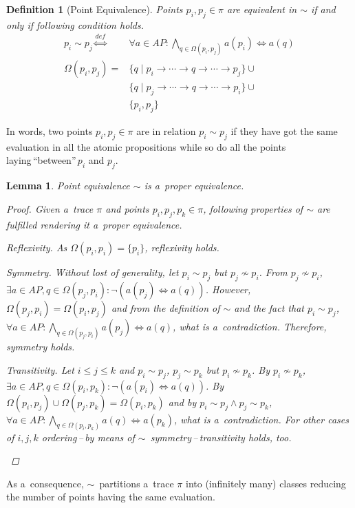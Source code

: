\documentclass[12pt,twoside,draft]{fithesis}
\newtheorem{mydef}{Definition}
\newtheorem{mylemma}{Lemma}
\begin{document}
\begin{mydef}[Point Equivalence]
Points $p_i,p_j\in\pi$ are equivalent in $\sim$ if and only if following
condition holds.
\begin{align}
	p_i\sim p_j	\overset{def}{\iff}&\forall a\in AP:
		\bigwedge_{q\in\Omega(p_i,p_j)}a(p_i)\iff a(q)\\
\Omega(p_i,p_j)=&\{q\mid p_i\rightarrow\dotsm\rightarrow q
		\rightarrow\dotsm\rightarrow p_j\}\cup\nonumber\\
		&\{q\mid p_j\rightarrow\dotsm\rightarrow q\rightarrow\dotsm
		\rightarrow p_i\}\cup\nonumber\\
		&\{p_i,p_j\}
\end{align}
\end{mydef}
In words, two points $p_i,p_j\in\pi$ are in relation $p_i\sim p_j$ if
they have got the same evaluation in all the atomic propositions while
so do all the points laying\,``between''\,$p_i$ and $p_j$.
\begin{mylemma}
Point equivalence $\sim$ is a~proper equivalence.
\begin{proof}Given a~trace $\pi$ and points $p_i,p_j,p_k\in\pi$,
following properties of $\sim$ are fulfilled rendering it a~proper
equivalence.
	\begin{inparaenum}
		\item{Reflexivity.} As $\Omega(p_i,p_i)=\{p_i\}$,
			reflexivity holds.
		\item{Symmetry.} Without lost of generality, let $p_i\sim p_j$
			but $p_j\not\sim p_i$. From $p_j\not\sim p_i$,
			$\exists a\in AP,q\in\Omega(p_j, p_i):\neg(a(p_j)
			\iff a(q))$. However, $\Omega(p_j, p_i)=\Omega(p_i,p_j)$
			and from the definition of $\sim$ and the fact that
			$p_i\sim p_j$,
			$\forall a\in AP:\bigwedge_{q\in\Omega(p_j,p_i)}a(p_j)\iff
			a(q)$, what is a~contradiction. Therefore, symmetry holds.
		\item{Transitivity.} Let $i\leq j\leq k$ and $p_i\sim p_j$,
			$p_j\sim p_k$ but $p_i\not\sim p_k$. By $p_i\not\sim p_k$,
			$\exists a\in AP, q\in\Omega(p_i, p_k):
			\neg(a(p_i)\iff a(q))$. By
			$\Omega(p_i,p_j)\cup\Omega(p_j,p_k)=\Omega(p_i,p_k)$ and by
			$p_i\sim p_j\wedge p_j\sim p_k$,
			$\forall a\in AP:\bigwedge_{q\in\Omega(p_i,p_k)}a(q)
			\iff a(p_k)$, what is a~contradiction. For other cases of
			$i,j,k$ ordering\,--\,by means of
			$\sim$~symmetry\,--\,transitivity holds, too.
	\end{inparaenum}
	\qedhere
\end{proof}
\end{mylemma}
As a~consequence, $\sim$~partitions a~trace $\pi$ into
(infinitely many) classes reducing the number of points
having the same evaluation.
\end{document}
